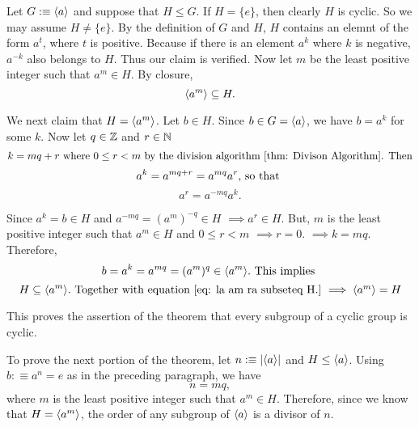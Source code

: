 \begin{prf}
  Let $G :\equiv \langle a \rangle$ and suppose that $H \leq G$. If $H=\{ e\}$, then clearly $H$ is cyclic. So we may assume $H \neq \{e\}.$ By the definition of $G$ and $H$, $H$ contains an elemnt of the form $a^t$, where $t$ is positive. Because if there is an element $a^k$ where $k$ is negative, $a^{-k}$ also belongs to $H$. Thus our claim is verified. Now let $m$ be the least positive integer such that $a^m \in H$. By closure,
  \begin{equation}
    \label{eq: la am ra subseteq H.}
    \langle a^m \rangle \subseteq H.
  \end{equation}

  We next claim that $H=\langle a^m \rangle$. Let $b \in H$. Since $b \in G = \langle a \rangle$, we have $b = a^k$ for some $k$. Now let $q \in \mathbb{Z}$ and $r \in \mathbb{N}$ \st
  \begin{equation}
    k = mq + r $ where $ 0 \leq r < m $ by the division algorithm \ref{thm: Divison Algorithm}. Then$
  \end{equation}
  \begin{equation}
    a^k = a^{mq+r} = a^{mq}a^r, $ so that $
  \end{equation}
  \begin{equation}
    a^r=a^{-mq}a^k.
  \end{equation}

  Since $a^k = b \in H$ and $a^{-mq}=(a^m)^{-q} \in H$
  $\implies a^{r} \in H$. But, $m$ is the least positive integer such that $a^m \in H$ and $ 0 \leq r < m $ $\implies r=0$. $\implies k=mq$. Therefore,
  \begin{equation}
    b = a^k = a^{mq} = (a^m)^q \in \la a^m \ra. $ This implies $
  \end{equation}
  \begin{equation}
    H \subseteq \la a^m \ra.$ Together with equation \eqref{eq: la am ra subseteq H.} $ \implies \la a^m \ra = H
  \end{equation}

  This proves the assertion of the theorem that every subgroup of a cyclic group is cyclic.

  To prove the next portion of the theorem, let $n :\equiv \abs{\langle a \rangle}$ and $H \leq \langle a \rangle$. Using $b :\equiv a^n = e$ as in the preceding paragraph, we have
  \begin{equation}
    n = mq,
  \end{equation}
  where $m$ is the least positive integer such that $a^m \in H$. Therefore, since we know that $H = \langle a^m \rangle$, the order of any subgroup of $\langle a \rangle$ is a divisor of $n$.


\end{prf}
